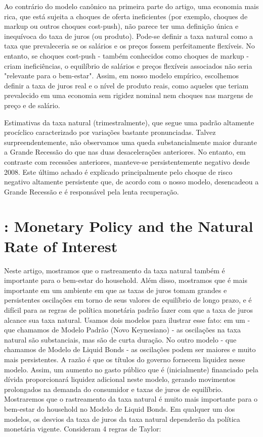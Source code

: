 Ao contrário do modelo canônico na primeira parte do artigo, uma economia mais rica, que está sujeita a choques de oferta ineficientes (por exemplo, choques de markup ou outros choques cost-push), não parece ter uma definição única e inequívoca do taxa de juros (ou produto). Pode-se definir a taxa natural como a taxa que prevaleceria se os salários e os preços fossem perfeitamente flexíveis. No entanto, se choques cost-push - também conhecidos como choques de markup - criam ineficiências, o equilíbrio de salários e preços flexíveis associados não seria "relevante para o bem-estar". Assim, em nosso modelo empírico, escolhemos definir a taxa de juros real e o nível de produto reais, como aqueles que teriam prevalecido em uma economia sem rigidez nominal nem choques nas margens de preço e de salário.

Estimativas da taxa natural (trimestralmente), que segue uma padrão altamente procíclico caracterizado por variações bastante pronunciadas. Talvez surpreendentemente, não observamos uma queda substancialmente maior durante a Grande Recessão do que nas duas desacelerações anteriores. No entanto, em contraste com recessões anteriores, manteve-se persistentemente negativo desde 2008. Este último achado é explicado principalmente pelo choque de risco negativo altamente persistente que, de acordo com o nosso modelo, desencadeou a Grande Recessão e é responsável pela lenta recuperação.
%
%
\section{\citet{Canzoneri:2015}: Monetary Policy and the Natural Rate of Interest}

Neste artigo, mostramos que o rastreamento da taxa natural também é importante para o bem-estar do household. Além disso, mostramos que é mais importante em um ambiente em que as taxas de juros tomam grandes e persistentes oscilações em torno de seus valores de equilíbrio de longo prazo, e é difícil para as regras de política monetária padrão fazer com que a taxa de juros alcance sua taxa natural. Usamos dois modelos para ilustrar esse fato: em um - que chamamos de Modelo Padrão (Novo Keynesiano) - as oscilações na taxa natural são substanciais, mas são de curta duração. No outro modelo - que chamamos de Modelo de Liquid Bonds - as oscilações podem ser maiores e muito mais persistentes. A razão é que os títulos do governo fornecem liquidez nesse modelo. Assim, um aumento no gasto público que é (inicialmente) financiado pela dívida proporcionará liquidez adicional neste modelo, gerando movimentos prolongados na demanda do consumidor e taxas de juros de equilíbrio. Mostraremos que o rastreamento da taxa natural é muito mais importante para o bem-estar do household no Modelo de Liquid Bonds. Em qualquer um dos modelos, os desvios da taxa de juros da taxa natural dependerão da política monetária vigente. Consideram 4 regras de Taylor:

